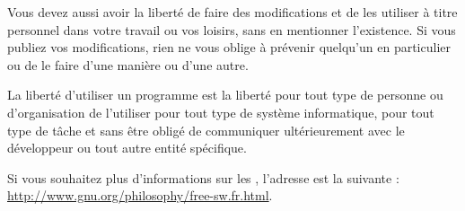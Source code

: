 Vous devez aussi avoir la liberté de faire des modifications et de les utiliser à titre personnel dans votre travail ou vos loisirs, sans en mentionner l'existence. Si vous publiez vos modifications, rien ne vous oblige à prévenir quelqu'un en particulier ou de le faire d'une manière ou d'une autre.\par
La liberté d'utiliser un programme est la liberté pour tout type de personne ou d'organisation de l'utiliser pour tout type de système informatique, pour tout type de tâche et sans être obligé de communiquer ultérieurement avec le développeur ou tout autre entité spécifique.\par
Si vous souhaitez plus d'informations sur les , l'adresse est la suivante : \url{http://www.gnu.org/philosophy/free-sw.fr.html}.
\newpage
